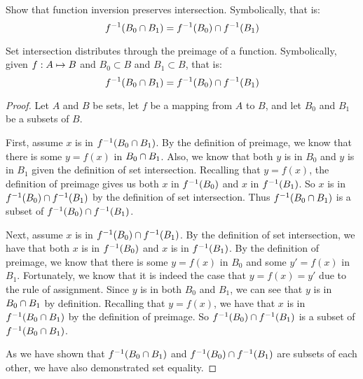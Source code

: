 \documentclass[main.tex]{subfiles}
\begin{document}
\subproblem{}\label{s2p2c}

Show that function inversion preserves intersection. Symbolically, that is:
\[{f}^{-1}(B_0 \cap B_1) = {f}^{-1}(B_0) \cap {f}^{-1}(B_1)\]

\begin{thm}
	Set intersection distributes through the preimage of a function.
	Symbolically, given \({f}: {A} \mapsto{} {B}\) and \(B_0 \subset B\) and
	\(B_1 \subset B\), that is:
	\[{f}^{-1}(B_0 \cap B_1) = {f}^{-1}(B_0) \cap {f}^{-1}(B_1)\]
\end{thm}
\begin{proof}
	Let \(A\) and \(B\) be sets, let \(f\) be a mapping from \(A\) to \(B\),
	and let \(B_0\) and \(B_1\) be a subsets of \(B\).

	First, assume \(x\) is in \({f}^{-1}(B_0 \cap B_1)\). By the
	definition of preimage, we know that there is some \(y = f(x)\) in
	\(B_0 \cap B_1\). Also, we know that both \(y\) is in \(B_0\) and
	\(y\) is in \(B_1\) given the definition of set intersection. Recalling
	that \(y = f(x)\), the definition of preimage gives us both \(x\) in
	\({f}^{-1}(B_0)\) and \(x\) in \({f}^{-1}(B_1)\). So \(x\) is in
	\({f}^{-1}(B_0) \cap {f}^{-1}(B_1)\) by the definition of
	set intersection. Thus \({f}^{-1}(B_0 \cap B_1)\) is a subset
	of \({f}^{-1}(B_0) \cap {f}^{-1}(B_1)\).

	Next, assume \(x\) is in
	\({f}^{-1}(B_0) \cap {f}^{-1}(B_1)\). By the definition of
	set intersection, we have that both \(x\) is in \({f}^{-1}(B_0)\) and
	\(x\) is in \({f}^{-1}(B_1)\). By the definition of preimage, we know
	that there is some \(y = f(x)\) in \(B_0\) and some \(y' = f(x)\) in
	\(B_1\). Fortunately, we know that it is indeed the case that
	\(y = f(x) = y'\) due to the rule of assignment. Since \(y\) is in both
	\(B_0\) and \(B_1\), we can see that \(y\) is in \(B_0 \cap B_1\)
	by definition. Recalling that \(y = f(x)\), we have that \(x\) is in
	\({f}^{-1}(B_0 \cap B_1)\) by the definition of preimage. So
	\({f}^{-1}(B_0) \cap {f}^{-1}(B_1)\) is a subset of
	\({f}^{-1}(B_0 \cap B_1)\).

	As we have shown that \({f}^{-1}(B_0 \cap B_1)\) and
	\({f}^{-1}(B_0) \cap {f}^{-1}(B_1)\) are subsets of each
	other, we have also demonstrated set equality.
\end{proof}
\end{document}
